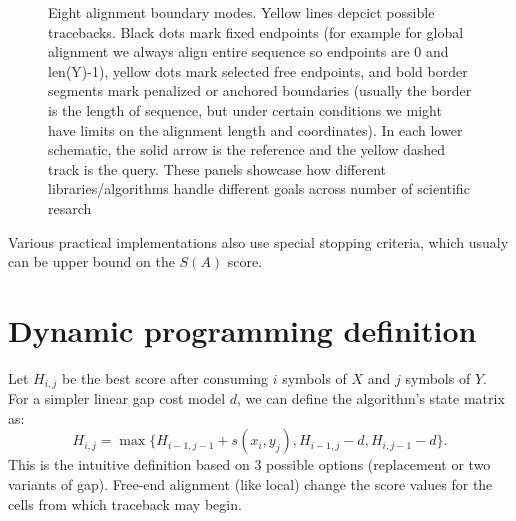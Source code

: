 \begin{figure}[H]
  \caption{Eight alignment boundary modes. Yellow lines depcict possible
    tracebacks. Black dots
    mark fixed endpoints (for example for global alignment we always align entire sequence so endpoints are 0 and len(Y)-1), yellow dots mark selected free endpoints, and bold
    border segments mark penalized or anchored boundaries (usually the border is the length of sequence, but under certain conditions we might have limits on the alignment length and coordinates). In each lower
    schematic, the solid arrow is the reference and the yellow dashed track is
    the query. These panels showcase how different libraries/algorithms handle different goals across number of scientific resarch}
  \label{fig:alignment-boundary-modes}
\end{figure}

Various practical implementations also use special stopping criteria, which usualy can be upper bound on the $S(A)$ score.

\section{Dynamic programming definition}
\label{sec:exact-dp}

Let \(H_{i,j}\) be the best score after consuming \(i\) symbols of \(X\) and
\(j\) symbols of \(Y\). For a simpler linear gap cost model \(d\), we can define the algorithm's state matrix as:
\begin{equation}
  H_{i,j}=\max\bigl\{
    H_{i-1,j-1}+s(x_i,y_j),
    H_{i-1,j}-d,
    H_{i,j-1}-d
  \bigr\}.
  \label{eq:linear-gap-dp}
\end{equation}
This is the intuitive definition based on 3 possible options (replacement or two variants of gap).
Free-end alignment (like local) change the score values for the cells from which traceback may begin.

